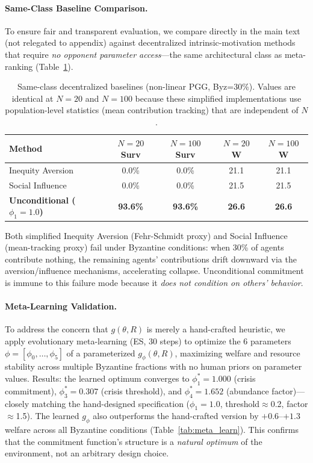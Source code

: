 \documentclass{article}
\begin{document}
\paragraph{Same-Class Baseline Comparison.}
To ensure fair and transparent evaluation, we compare directly in the main text (not relegated to appendix) against decentralized intrinsic-motivation methods that require \emph{no opponent parameter access}---the same architectural class as meta-ranking (Table~\ref{tab:baselines}).

\begin{table}[t]
\centering
\caption{Same-class decentralized baselines (non-linear PGG, Byz=30\%). Values are identical at $N{=}20$ and $N{=}100$ because these simplified implementations use population-level statistics (mean contribution tracking) that are independent of $N$.}
\label{tab:baselines}
\begin{tabular}{lcccc}
\toprule
\textbf{Method} & \textbf{$N{=}20$ Surv} & \textbf{$N{=}100$ Surv} & \textbf{$N{=}20$ W} & \textbf{$N{=}100$ W} \\
\midrule
Inequity Aversion & 0.0\% & 0.0\% & 21.1 & 21.1 \\
Social Influence & 0.0\% & 0.0\% & 21.5 & 21.5 \\
\midrule
\textbf{Unconditional ($\phi_1{=}1.0$)} & \textbf{93.6\%} & \textbf{93.6\%} & \textbf{26.6} & \textbf{26.6} \\
\bottomrule
\end{tabular}
\end{table}

\noindent Both simplified Inequity Aversion (Fehr-Schmidt proxy) and Social Influence (mean-tracking proxy) fail under Byzantine conditions: when 30\% of agents contribute nothing, the remaining agents' contributions drift downward via the aversion/influence mechanisms, accelerating collapse.
Unconditional commitment is immune to this failure mode because it \emph{does not condition on others' behavior}.

\paragraph{Meta-Learning Validation.}
To address the concern that $g(\theta, R)$ is merely a hand-crafted heuristic, we apply evolutionary meta-learning (ES, 30 steps) to optimize the 6 parameters $\phi = [\phi_0, \ldots, \phi_5]$ of a parameterized $g_\phi(\theta, R)$, maximizing welfare and resource stability across multiple Byzantine fractions with no human priors on parameter values.
Results: the learned optimum converges to $\phi_1^* = 1.000$ (crisis commitment), $\phi_3^* = 0.307$ (crisis threshold), and $\phi_4^* = 1.652$ (abundance factor)---closely matching the hand-designed specification ($\phi_1{=}1.0$, threshold$\approx$0.2, factor$\approx$1.5).
The learned $g_\phi$ also outperforms the hand-crafted version by $+0.6$--$+1.3$ welfare across all Byzantine conditions (Table~\ref{tab:meta_learn}).
This confirms that the commitment function's structure is a \emph{natural optimum} of the environment, not an arbitrary design choice.
\end{document}
